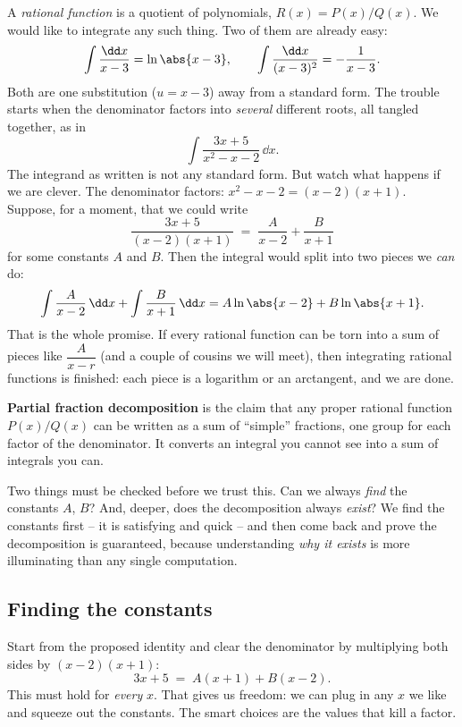 A \emph{rational function} is a quotient of polynomials, $R(x) = P(x)/Q(x)$.
We would like to integrate any such thing. Two of them are already easy:
\[
\int \frac{\dd x}{x - 3} = \ln\abs{x-3},
\qquad
\int \frac{\dd x}{(x-3)^2} = -\frac{1}{x-3}.
\]
Both are one substitution ($u = x-3$) away from a standard form. The trouble
starts when the denominator factors into \emph{several} different roots, all
tangled together, as in
\[
\int \frac{3x + 5}{x^2 - x - 2}\,\dd x .
\]
The integrand as written is not any standard form. But watch what happens if
we are clever. The denominator factors: $x^2 - x - 2 = (x-2)(x+1)$. Suppose,
for a moment, that we could write
\[
\frac{3x+5}{(x-2)(x+1)} \;=\; \frac{A}{x-2} + \frac{B}{x+1}
\]
for some constants $A$ and $B$. Then the integral would split into two pieces
we \emph{can} do:
\[
\int \frac{A}{x-2}\,\dd x + \int \frac{B}{x+1}\,\dd x
= A\ln\abs{x-2} + B\ln\abs{x+1}.
\]
That is the whole promise. If every rational function can be torn into a sum
of pieces like $\dfrac{A}{x-r}$ (and a couple of cousins we will meet), then
integrating rational functions is finished: each piece is a logarithm or an
arctangent, and we are done.

\begin{focusbox}
\textbf{Partial fraction decomposition} is the claim that any proper rational
function $P(x)/Q(x)$ can be written as a sum of ``simple'' fractions, one
group for each factor of the denominator. It converts an integral you cannot
see into a sum of integrals you can.
\end{focusbox}

Two things must be checked before we trust this. Can we always
\emph{find} the constants $A$, $B$? And, deeper, does the decomposition
always \emph{exist}? We find the constants first -- it is satisfying and
quick -- and then come back and prove the decomposition is guaranteed, because
understanding \emph{why it exists} is more illuminating than any single
computation.

\subsection{Finding the constants}

Start from the proposed identity and clear the denominator by multiplying both
sides by $(x-2)(x+1)$:
\[
3x + 5 \;=\; A(x+1) + B(x-2).
\]
This must hold for \emph{every} $x$. That gives us freedom: we can plug in any
$x$ we like and squeeze out the constants. The smart choices are the values
that kill a factor.

